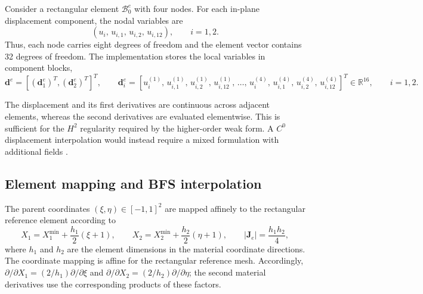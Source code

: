 \documentclass[preprint,12pt]{elsarticle}
\begin{document}
Consider a rectangular element $\mathcal{B}_0^e$ with four nodes. For
each in-plane displacement component, the nodal variables are
\begin{equation}
 \left(u_i,\,u_{i,1},\,u_{i,2},\,u_{i,12}\right),
 \qquad i=1,2.
 \label{eq:bfs-nodal-variables}
\end{equation}
Thus, each node carries eight degrees of freedom and the element vector
contains 32 degrees of freedom. The implementation stores the local
variables in component blocks,
\begin{equation}
 \mathbf{d}^e=
 \left[\left(\mathbf{d}_1^e\right)^T,
 \left(\mathbf{d}_2^e\right)^T\right]^T,
 \qquad
 \mathbf{d}_i^e=
 \left[u_i^{(1)},\,u_{i,1}^{(1)},\,u_{i,2}^{(1)},\,u_{i,12}^{(1)},\,
 \ldots,\,
 u_i^{(4)},\,u_{i,1}^{(4)},\,u_{i,2}^{(4)},\,u_{i,12}^{(4)}\right]^T
 \in\mathbb{R}^{16},
 \qquad i=1,2.
 \label{eq:bfs-element-dof-vector}
\end{equation}

The displacement and its first derivatives are continuous across adjacent
elements, whereas the second derivatives are evaluated elementwise. This
is sufficient for the $H^2$ regularity required by the higher-order weak
form. A $C^0$ displacement interpolation would instead require a mixed
formulation with additional fields \cite{ShuKingFleck1999,AmanatidouAravas2002}.

\subsection{Element mapping and BFS interpolation}
\label{sec:bfs-element-mapping}

The parent coordinates $(\xi,\eta)\in[-1,1]^2$ are mapped affinely to
the rectangular reference element according to
\begin{equation}
 X_1=X_1^{\min}+\frac{h_1}{2}(\xi+1),
 \qquad
 X_2=X_2^{\min}+\frac{h_2}{2}(\eta+1),
 \qquad
 \left|\mathbf{J}_e\right|=\frac{h_1h_2}{4},
 \label{eq:bfs-affine-mapping}
\end{equation}
where $h_1$ and $h_2$ are the element dimensions in the material
coordinate directions. The coordinate mapping is affine for the
rectangular reference mesh. Accordingly,
$\partial/\partial X_1=(2/h_1)\partial/\partial\xi$ and
$\partial/\partial X_2=(2/h_2)\partial/\partial\eta$; the second
material derivatives use the corresponding products of these factors.
\end{document}
